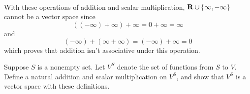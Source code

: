 \begin{solution}
    \\ With these operations of addition and scalar multiplication, $\mathbf{R} \cup \{\infty, -\infty\}$ cannot be a vector space since
    $$((-\infty) + \infty) + \infty = 0 + \infty = \infty$$
    and
    $$(-\infty) + (\infty + \infty) = (-\infty) + \infty = 0$$
    which proves that addition isn't associative under this operation. \\
\end{solution}

\begin{exercise}
    Suppose $S$ is a nonempty set. Let $V^S$ denote the set of functions from $S$ to $V$. Define a natural addition and scalar multiplication on $V^S$, and show that $V^S$ is a vector space with these definitions. \\
\end{exercise}

